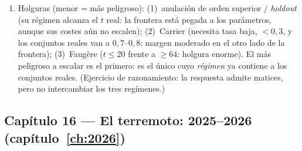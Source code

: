 \documentclass[11pt,a4paper,oneside]{report}
\begin{document}
\begin{enumerate}[leftmargin=1.9em,itemsep=4pt]
        pérdida: observación~\ref{obs:isd-acortamiento}), y contra
        la división del soporte el atacante debe adivinar qué $n$
        de las $q$ columnas forman $L$ y en qué orden: paga
        $\binom{q}{n}$ (y tuplas ordenadas: $2^{9116{,}8}$); con
        $n=q$ ese frente se desvanece
        (observación~\ref{obs:est-nq}). El diseño cobra en un
        frente lo que no pierde en el otro.
  \item Holguras (menor = más peligroso): (1)~anulación de orden
        superior / \emph{holdout} (su régimen alcanza el $t$ real:
        la frontera está pegada a los parámetros, aunque sus
        costes aún no escalen); (2)~Carrier (necesita tasa baja,
        $<0{,}3$, y los conjuntos reales van a $0{,}7$--$0{,}8$:
        margen moderado en el otro lado de la frontera);
        (3)~Faugère ($t\le20$ frente a $\ge64$: holgura enorme).
        El más peligroso a escalar es el primero: es el único
        cuyo \emph{régimen} ya contiene a los conjuntos reales.
        (Ejercicio de razonamiento: la respuesta admite matices,
        pero no intercambiar los tres regímenes.)
\end{enumerate}

\subsection*{Capítulo 16 --- El terremoto: 2025--2026
(capítulo~\ref{ch:2026})}
\end{document}
